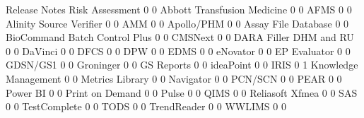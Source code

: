 \documentclass{article}
\begin{document}
\begin{Schunk}
\begin{Soutput}
                                Release Notes Risk Assessment
                                            0               0
  Abbott Transfusion Medicine               0               0
  AFMS                                      0               0
  Alinity Source Verifier                   0               0
  AMM                                       0               0
  Apollo/PHM                                0               0
  Assay File Database                       0               0
  BioCommand Batch Control Plus             0               0
  CMSNext                                   0               0
  DARA Filler DHM and RU                    0               0
  DaVinci                                   0               0
  DFCS                                      0               0
  DPW                                       0               0
  EDMS                                      0               0
  eNovator                                  0               0
  EP Evaluator                              0               0
  GDSN/GS1                                  0               0
  Groninger                                 0               0
  GS Reports                                0               0
  ideaPoint                                 0               0
  IRIS                                      0               1
  Knowledge Management                      0               0
  Metrics Library                           0               0
  Navigator                                 0               0
  PCN/SCN                                   0               0
  PEAR                                      0               0
  Power BI                                  0               0
  Print on Demand                           0               0
  Pulse                                     0               0
  QIMS                                      0               0
  Reliasoft Xfmea                           0               0
  SAS                                       0               0
  TestComplete                              0               0
  TODS                                      0               0
  TrendReader                               0               0
  WWLIMS                                    0               0
                               

\end{Soutput}
\end{Schunk}
\end{document}
